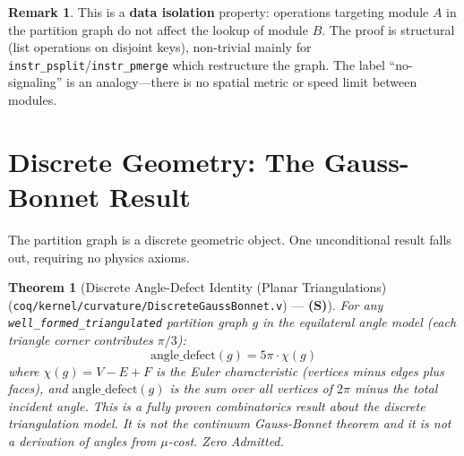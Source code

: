 \documentclass[11pt, a4paper]{report}
\theoremstyle{definition}
\newtheorem{remark}{Remark}[chapter]
\theoremstyle{plain}
\newtheorem{theorem}{Theorem}[chapter]
\begin{document}
\begin{remark}
This is a \textbf{data isolation} property: operations targeting module $A$ in the partition graph do not affect the lookup of module $B$. The proof is structural (list operations on disjoint keys), non-trivial mainly for \texttt{instr\_psplit}/\texttt{instr\_pmerge} which restructure the graph. The label ``no-signaling'' is an analogy---there is no spatial metric or speed limit between modules.
\end{remark}

\section{Discrete Geometry: The Gauss-Bonnet Result}
\label{sec:gauss_bonnet}

The partition graph is a discrete geometric object. One unconditional result falls out, requiring no physics axioms.

\begin{theorem}[Discrete Angle-Defect Identity (Planar Triangulations) {\normalfont (\texttt{coq/kernel/curvature/DiscreteGaussBonnet.v})} --- \textbf{(S)}]
For any \texttt{well\_formed\_triangulated} partition graph $g$ in the equilateral angle model (each triangle corner contributes $\pi/3$):
\[
\mathrm{angle\_defect}(g) = 5\pi \cdot \chi(g)
\]
where $\chi(g) = V - E + F$ is the Euler characteristic (vertices minus edges plus faces), and $\mathrm{angle\_defect}(g)$ is the sum over all vertices of $2\pi$ minus the total incident angle. This is a fully proven combinatorics result about the discrete triangulation model. It is not the continuum Gauss-Bonnet theorem and it is not a derivation of angles from $\mu$-cost. Zero Admitted.
\end{theorem}
\end{document}
